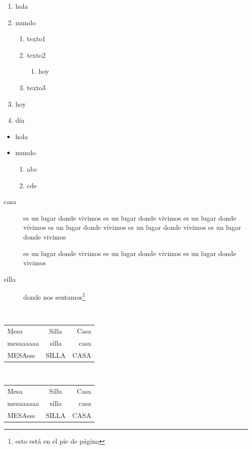\documentclass[12pt,a4paper]{article}
\begin{document}
\begin{enumerate}
	\item hola
	\item mundo
	\begin{enumerate}
		\item texto1
		\item texto2
		\begin{enumerate}
			\item hoy
		\end{enumerate}
		\item texto3
	\end{enumerate}
	\item hoy
	\item día
\end{enumerate}

\begin{itemize}
	\item hola 
	\item mundo
	\begin{enumerate}
		\item abc
		\item cde
	\end{enumerate}	
\end{itemize}

\begin{description}
	\item[casa] es un lugar donde vivimos es un lugar donde vivimos es un lugar donde vivimos es un lugar donde vivimos es un lugar donde vivimos es un lugar donde vivimos
	
	es un lugar donde vivimos es un lugar donde vivimos es un lugar donde vivimos
	\item[silla] donde nos sentamos\footnote{esto está en el pie de página}
\end{description}

\ \\[2cm]

\begin{tabular}{lcr}
	Mesa & Silla & Casa \\
	mesaaaaaa & silla & casa \\
	MESAsss & SILLA & CASA
\end{tabular}

\ \\[2cm]


\begin{tabular}{|l|c|r|}
	Mesa & Silla & Casa \\
	mesaaaaaa & silla & casa \\
	MESAsss & SILLA & CASA
\end{tabular}
\end{document}
